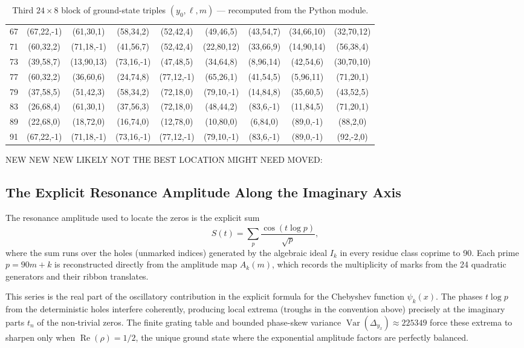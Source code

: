 \documentclass[11pt,a4paper]{article}
\begin{document}
\begin{table}[htbp]
\begin{tabular}{c|cccccccc}
67 & (67,22,-1) & (61,30,1) & (58,34,2) & (52,42,4) & (49,46,5) & (43,54,7) & (34,66,10) & (32,70,12) \\
71 & (60,32,2) & (71,18,-1) & (41,56,7) & (52,42,4) & (22,80,12) & (33,66,9) & (14,90,14) & (56,38,4) \\
73 & (39,58,7) & (13,90,13) & (73,16,-1) & (47,48,5) & (34,64,8) & (8,96,14) & (42,54,6) & (30,70,10) \\
77 & (60,32,2) & (36,60,6) & (24,74,8) & (77,12,-1) & (65,26,1) & (41,54,5) & (5,96,11) & (71,20,1) \\
79 & (37,58,5) & (51,42,3) & (58,34,2) & (72,18,0) & (79,10,-1) & (14,84,8) & (35,60,5) & (43,52,5) \\
83 & (26,68,4) & (61,30,1) & (37,56,3) & (72,18,0) & (48,44,2) & (83,6,-1) & (11,84,5) & (71,20,1) \\
89 & (22,68,0) & (18,72,0) & (16,74,0) & (12,78,0) & (10,80,0) & (6,84,0) & (89,0,-1) & (88,2,0) \\
91 & (67,22,-1) & (71,18,-1) & (73,16,-1) & (77,12,-1) & (79,10,-1) & (83,6,-1) & (89,0,-1) & (92,-2,0) \\
\end{tabular}
\caption{Third \(24 \times 8\) block of ground-state triples \((y_0, \ell, m)\) — recomputed from the Python module.}
\label{tab:ym-block3-recomputed}
\end{table}

NEW NEW NEW LIKELY NOT THE BEST LOCATION MIGHT NEED MOVED:
\subsection{The Explicit Resonance Amplitude Along the Imaginary Axis}

The resonance amplitude used to locate the zeros is the explicit sum
\[
S(t)=\sum_{p}\frac{\cos(t\log p)}{\sqrt{p}},
\]
where the sum runs over the holes (unmarked indices) generated by the algebraic ideal \(I_k\) in every residue class coprime to 90. Each prime \(p=90m+k\) is reconstructed directly from the amplitude map \(A_k(m)\), which records the multiplicity of marks from the 24 quadratic generators and their ribbon translates.

This series is the real part of the oscillatory contribution in the explicit formula for the Chebyshev function \(\psi_k(x)\). The phases \(t\log p\) from the deterministic holes interfere coherently, producing local extrema (troughs in the convention above) precisely at the imaginary parts \(t_n\) of the non-trivial zeros. The finite grating table and bounded phase-skew variance \(\operatorname{Var}(\Delta_{y_x})\approx225349\) force these extrema to sharpen only when \(\operatorname{Re}(\rho)=1/2\), the unique ground state where the exponential amplitude factors are perfectly balanced.
\end{document}
